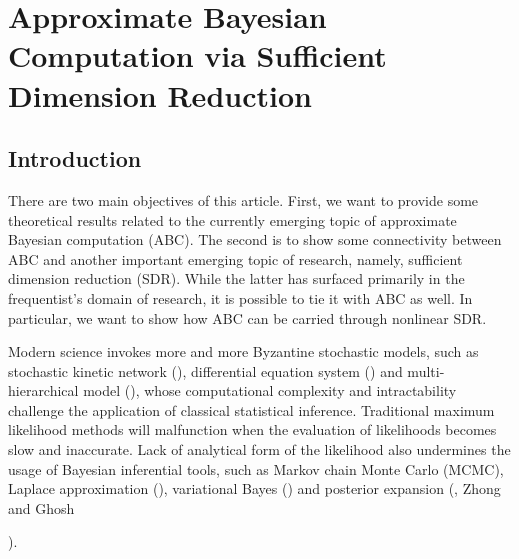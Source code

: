 \chapter{Approximate Bayesian Computation via Sufficient Dimension Reduction}

\setcounter{assumption}{0}
\section{Introduction}

There are two main objectives of this article. First, we want to provide
some theoretical results related to the currently emerging topic of
approximate Bayesian computation (ABC). The second is to show some
connectivity between ABC and another important emerging topic of research,
namely, sufficient dimension reduction (SDR). While the latter has
surfaced primarily in the{} frequentist's{}
domain of research, it is possible to tie it with ABC as well. In
particular, we want to show how ABC can be carried through nonlinear
SDR. 

Modern science invokes more and more Byzantine stochastic models,
such as stochastic kinetic network (\citet{wilkinson2011stochastic}),
differential equation system (\citet{picchini2014inference}) and
multi-hierarchical model (\citet{jasra2012filtering}), whose computational
complexity and intractability challenge the application of classical
statistical inference. Traditional maximum likelihood methods will
malfunction when the evaluation of likelihoods becomes slow and inaccurate.
Lack of analytical form of the likelihood also  {undermines
} the usage of Bayesian inferential tools, such as Markov chain Monte
Carlo (MCMC), Laplace approximation (\citet{tierney1986accurate}),
variational Bayes (\citet{jaakkola2000bayesian}) and posterior expansion
(\citet{johnson1970asymptotic}, Zhong and Ghosh%

). 

